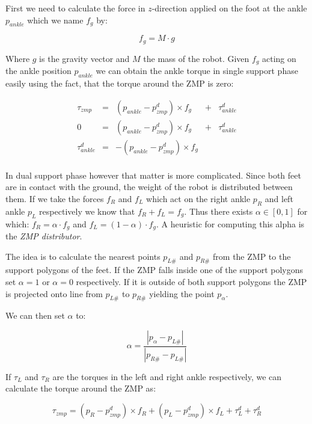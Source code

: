 \documentclass[english,ngerman]{KITreprt}
\begin{document}
First we need to calculate the force in $z$-direction applied on the
foot at the ankle $p_{ankle}$ which we name $f_g$ by:

\begin{equation}
f_g = M \cdot g
\end{equation}

Where $g$ is the gravity vector and $M$ the mass of the robot. Given
$f_g$ acting on the ankle position $p_{ankle}$ we can obtain the ankle
torque in single support phase easily using the fact, that the torque
around the ZMP is zero:

\begin{equation}
\begin{array}{lcccr}
\tau_{zmp} & = & (p_{ankle} - p^d_{zmp}) \times f_g & + & \tau^d_{ankle} \\
0 & = & (p_{ankle} - p^d_{zmp}) \times f_g & + & \tau^d_{ankle} \\
\tau^d_{ankle} & = & -(p_{ankle} - p^d_{zmp}) \times f_g & & \\
\end{array}
\end{equation}

In dual support phase however that matter is more complicated. Since
both feet are in contact with the ground, the weight of the robot is
distributed between them. If we take the forces $f_R$ and $f_L$ which
act on the right ankle $p_R$ and left ankle $p_L$ respectively we know
that $f_R + f_L = f_g$. Thus there exists $\alpha \in [0, 1]$ for which:
$f_R = \alpha \cdot f_g$ and $f_L = (1-\alpha) \cdot f_g$. A heuristic
for computing this alpha is the \emph{ZMP distributor}.

The idea is to calculate the nearest points $p_{L\#}$ and $p_{R\#}$ from
the ZMP to the support polygons of the feet. If the ZMP falls inside one
of the support polygons set $\alpha = 1$ or $\alpha = 0$ respectively.
If it is outside of both support polygons the ZMP is projected onto line
from $p_{L\#}$ to $p_{R\#}$ yielding the point $p_{\alpha}$.

We can then set $\alpha$ to:

\begin{equation}
\alpha = \frac{|p_{\alpha} - p_{L\#}|}{|p_{R\#} - p_{L\#}|}
\end{equation}

If $\tau_L$ and $\tau_R$ are the torques in the left and right ankle
respectively, we can calculate the torque around the ZMP as:

\begin{equation} \label{eq:ds-torque}
\tau_{zmp} = (p_R - p^d_{zmp}) \times f_R + (p_L - p^d_{zmp}) \times f_L + \tau^d_L + \tau^d_R
\end{equation}
\end{document}
